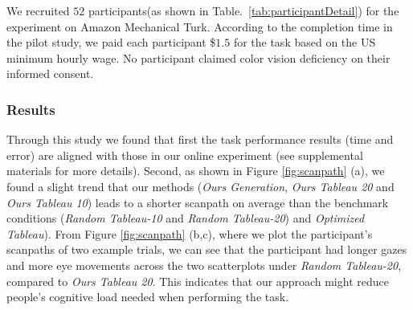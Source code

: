 \vspace{.3em}
We recruited $52$ participants(as shown in Table.~\ref{tab:participantDetail}) for the experiment on Amazon Mechanical Turk.
According to the completion time in the pilot study, we paid each participant \$$1.5$ for the task based on the US minimum hourly wage.
No participant claimed color vision deficiency on their informed consent.

\subsubsection{Results}
%


Through this study we found that first the task performance results (time and error) are aligned with those in our online experiment (see supplemental materials for more details). Second, as shown in Figure \ref{fig:scanpath} (a), we found a slight trend that our methods (\emph{Ours Generation}, \emph{Ours Tableau 20} and \emph{Ours Tableau 10}) leads to a shorter scanpath on average than the benchmark conditions (\emph{Random Tableau-10} and \emph{Random Tableau-20}) and \emph{Optimized Tableau}). From Figure \ref{fig:scanpath} (b,c), where we plot the participant's scanpaths of two example trials, we can see that the participant had longer gazes and more eye movements across the two scatterplots under \emph{Random Tableau-20}, compared to \emph{Ours Tableau 20}. This indicates that our approach might reduce people's cognitive load needed when performing the task.

